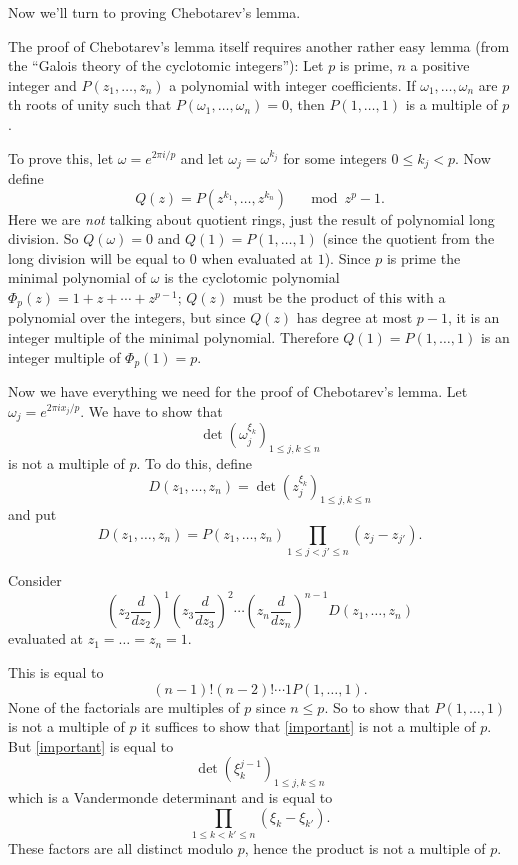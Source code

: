 \documentclass{article}
\begin{document}
Now we'll turn to proving Chebotarev's lemma.

The proof of Chebotarev's lemma itself requires another rather
easy lemma (from the ``Galois theory of the cyclotomic integers''): Let $p$ is prime, $n$ a positive integer and $P(z_1,\ldots,z_n)$
a polynomial with integer coefficients. If $\omega_1,\ldots,\omega_n$ are
$p$th roots of unity such that $P(\omega_1,\ldots,\omega_n)=0$, then
$P(1,\ldots,1)$ is a multiple of $p$.

To prove this, let $\omega=e^{2\pi i/p}$ and let $\omega_j=\omega^{k_j}$
for some integers $0 \leq k_j<p$. Now define
\[
Q(z)=P(z^{k_1},\ldots,z^{k_n}) \quad \mod z^p-1.
\]
Here we are \emph{not} talking about quotient rings, just the result of polynomial long division.
So $Q(\omega)=0$ and $Q(1)=P(1,\ldots,1)$ (since the quotient from the long division will be equal to $0$ when evaluated at $1$). Since
$p$ is prime the minimal polynomial of $\omega$ is the cyclotomic polynomial
$\Phi_p(z)=1+z+\cdots+z^{p-1}$; $Q(z)$ must be the product of this with a polynomial
over the integers, but since $Q(z)$ has degree at most $p-1$, it is an integer
multiple of the minimal polynomial.
Therefore $Q(1)=P(1,\ldots,1)$ is an integer multiple of $\Phi_p(1)=p$.

Now we have everything we need for the proof of Chebotarev's lemma.
Let $\omega_j=e^{2\pi ix_j/p}$. We have to show that
\[
\det(\omega_j^{\xi_k})_{1\leq j,k \leq n}
\]
is not a multiple of $p$. To do this, define
\[
D(z_1,\ldots,z_n)=\det(z_j^{\xi_k})_{1\leq j,k\leq n}
\]
and put
\[
D(z_1,\ldots,z_n)=P(z_1,\ldots,z_n) \prod_{1 \leq j<j' \leq n}(z_j-z_{j'}).
\]

Consider
\begin{equation}
\label{important}
(z_2 \frac{d}{dz_2})^1 (z_3 \frac{d}{dz_3})^2 \cdots (z_n \frac{d}{dz_n})^{n-1}
D(z_1,\ldots,z_n)
\end{equation}
evaluated at $z_1=\ldots=z_n=1$.

This is equal to
\[
(n-1)!(n-2)!\cdots 1P(1,\ldots,1).
\]
None of the factorials are multiples of $p$ since $n \leq p$. So to
show that $P(1,\ldots,1)$ is not a multiple of $p$ it suffices to show
that \eqref{important} is not a multiple of $p$. But \eqref{important} 
is equal to
\[
\det(\xi_k^{j-1})_{1 \leq j,k \leq n}
\]
which is a Vandermonde determinant and is equal to 
\[
\prod_{1 \leq k<k' \leq n} (\xi_k-\xi_{k'}).
\]
These factors are all distinct modulo $p$, hence the product is not
a
multiple of $p$.
\end{document}
